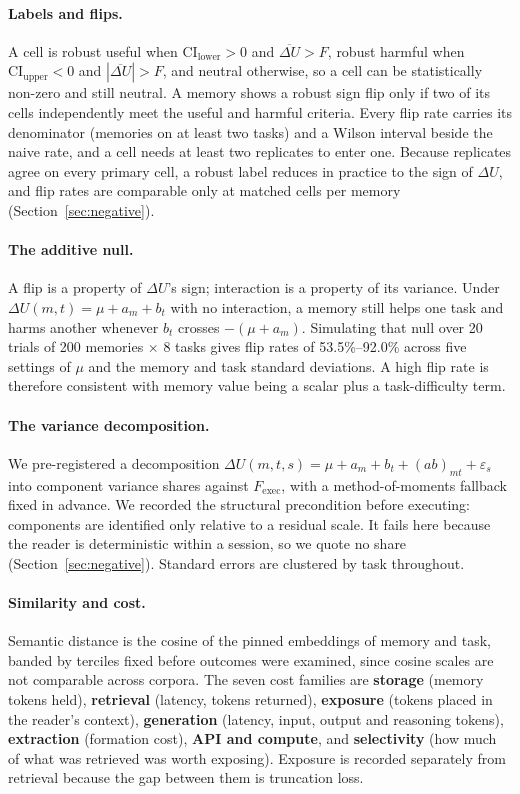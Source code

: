 \paragraph{Labels and flips.}
A cell is robust useful when $\mathrm{CI}_{\mathrm{lower}} > 0$ and
$\overline{\Delta U} > F$, robust harmful when $\mathrm{CI}_{\mathrm{upper}}
< 0$ and $|\overline{\Delta U}| > F$, and neutral otherwise, so a cell can be
statistically non-zero and still neutral. A memory shows a robust sign flip
only if two of its cells independently meet the useful and harmful criteria.
Every flip rate carries its denominator (memories on at least two tasks) and
a Wilson interval beside the naive rate, and a cell needs at least two
replicates to enter one. Because replicates agree on every primary cell, a
robust label reduces in practice to the sign of $\Delta U$, and flip rates are
comparable only at matched cells per memory (Section~\ref{sec:negative}).

\paragraph{The additive null.}
A flip is a property of $\Delta U$'s sign; interaction is a property of its
variance. Under $\Delta U(m,t) = \mu + a_m + b_t$ with no interaction, a
memory still helps one task and harms another whenever $b_t$ crosses
$-(\mu + a_m)$. Simulating that null over 20 trials of 200 memories $\times$
8 tasks gives flip rates of 53.5\%--92.0\% across five settings of $\mu$ and
the memory and task standard deviations. A high flip rate is therefore
consistent with memory value being a scalar plus a task-difficulty term.

\paragraph{The variance decomposition.}
We pre-registered a decomposition $\Delta U(m,t,s) = \mu + a_m + b_t +
(ab)_{mt} + \varepsilon_s$ into component variance shares against
$F_{\mathrm{exec}}$, with a method-of-moments fallback fixed in advance. We
recorded the structural precondition before executing: components are
identified only relative to a residual scale. It fails here because the
reader is deterministic within a session, so we quote no share
(Section~\ref{sec:negative}). Standard errors are clustered by task
throughout.

\paragraph{Similarity and cost.}
Semantic distance is the cosine of the pinned embeddings of memory and task,
banded by terciles fixed before outcomes were examined, since cosine scales
are not comparable across corpora. The seven cost families are
\textbf{storage} (memory tokens held), \textbf{retrieval} (latency, tokens
returned), \textbf{exposure} (tokens placed in the reader's context),
\textbf{generation} (latency, input, output and reasoning tokens),
\textbf{extraction} (formation cost), \textbf{API and compute}, and
\textbf{selectivity} (how much of what was retrieved was worth exposing).
Exposure is recorded separately from retrieval because the gap between them
is truncation loss.
